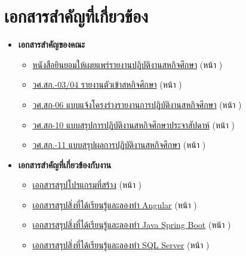 \chapter{เอกสารสำคัญที่เกี่ยวข้อง}
\begin{itemize}
    \item \textbf{เอกสารสำคัญของคณะ}
          \begin{itemize}
              \item \hyperlink{target:approval}{หนังสือยินยอมให้เผยแพร่รายงานปฏิบัติงานสหกิจศึกษา} (หน้า \pageref{page:approval})
              \item \hyperlink{target:03-04}{วศ.สก.-03/04 รายงานตัวเข้าสหกิจศึกษา} (หน้า \pageref{page:03-04})
              \item \hyperlink{target:06}{วศ.สก-06 แบบแจ้งโครงร่างรายงานการปฏิบัติงานสหกิจศึกษา} (หน้า \pageref{page:06})
              \item \hyperlink{target:10}{วศ.สก-10 แบบสรุปการปฏิบัติงานสหกิจศึกษาประจาสัปดาห์} (หน้า \pageref{page:10})
              \item \hyperlink{target:11}{วศ.สก.-11 แบบสรุปผลการปฏิบัติงานสหกิจศึกษา} (หน้า \pageref{page:11})
          \end{itemize}
    
    \item \textbf{เอกสารสำคัญที่เกี่ยวข้องกับงาน}
          \begin{itemize}
              \item \hyperlink{target:create}{เอกสารสรุปโปรแกรมที่สร้าง} (หน้า \pageref{page:create})
              \item \hyperlink{target:angular}{เอกสารสรุปสิ่งที่ได้เรียนรู้และลองทำ Angular} (หน้า \pageref{page:angular})
              \item \hyperlink{target:springboot}{เอกสารสรุปสิ่งที่ได้เรียนรู้และลองทำ Java Spring Boot} (หน้า \pageref{page:springboot})
              \item \hyperlink{target:sqlserver}{เอกสารสรุปสิ่งที่ได้เรียนรู้และลองทำ SQL Server} (หน้า \pageref{page:sqlserver})

          \end{itemize}

\end{itemize}







